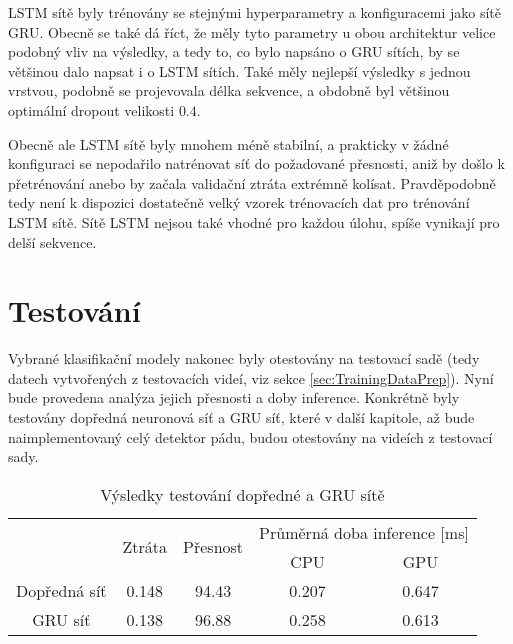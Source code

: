 LSTM sítě byly trénovány se stejnými hyperparametry a konfiguracemi jako sítě
GRU. Obecně se také dá říct, že měly tyto parametry u obou architektur velice
podobný vliv na výsledky, a tedy to, co bylo napsáno o GRU sítích, by se
většinou dalo napsat i o LSTM sítích. Také měly nejlepší výsledky s jednou
vrstvou, podobně se projevovala délka sekvence, a obdobně byl většinou
optimální dropout velikosti $0.4$.

Obecně ale LSTM sítě byly mnohem méně stabilní, a prakticky v žádné konfiguraci
se nepodařilo natrénovat síť do požadované přesnosti, aniž by došlo k
přetrénování anebo by začala validační ztráta extrémně kolísat. Pravděpodobně
tedy není k dispozici dostatečně velký vzorek trénovacích dat pro trénování
LSTM sítě. Sítě LSTM nejsou také vhodné pro každou úlohu, spíše vynikají pro
delší sekvence.

\section{Testování}
\label{sec:testing}

Vybrané klasifikační modely nakonec byly otestovány na testovací sadě (tedy
datech vytvořených z testovacích videí, viz sekce \ref{sec:TrainingDataPrep}).
Nyní bude provedena analýza jejich přesnosti a doby inference. Konkrétně byly
testovány dopředná neuronová síť a GRU síť, které v další kapitole, až bude
naimplementovaný celý detektor pádu, budou otestovány na videích z testovací
sady.

\begin{table}[htbp]
    \centering
    \caption{Výsledky testování dopředné a GRU sítě}
    \label{tab:testing}
    \begin{tabular}{|c|c|c|cc|}
        \hline
        \multirow{2}{*}{} & \multirow{2}{*}{Ztráta} & \multirow{2}{*}{Přesnost} & \multicolumn{2}{c|}{Průměrná doba inference [ms]}         \\ \cline{4-5}
                          &                         &                           & \multicolumn{1}{c|}{  CPU  }                      & GPU   \\ \hline
        Dopředná síť      & 0.148                   & 94.43                     & \multicolumn{1}{c|}{0.207}                        & 0.647 \\ \hline
        GRU síť           & 0.138                   & 96.88                     & \multicolumn{1}{c|}{0.258}                        & 0.613 \\ \hline
    \end{tabular}
\end{table}

